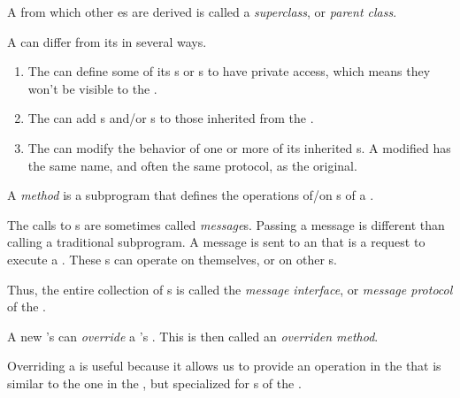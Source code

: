 \begin{definition}[Superclass]\label{def:OOP_Superclass}
  A  from which other es are derived is called a \emph{superclass}, or \emph{parent class}.
\end{definition}

A  can differ from its  in several ways.
\begin{enumerate}[noitemsep]
\item The  can define some of its s or s to have private access, which means they won't be visible to the .
\item The  can add s and/or s to those inherited from the .
\item The  can modify the behavior of one or more of its inherited s. A modified  has the same name, and often the same protocol, as the original.
\end{enumerate}

\begin{definition}[Method]\label{def:OOP_Method}
  A \emph{method} is a subprogram that defines the operations of/on s of a .
\end{definition}

\begin{definition}[Message]\label{def:OOP_Message}
  The calls to s are sometimes called \emph{message}s.
  Passing a message is different than calling a traditional subprogram.
  A message is sent to an  that is a request to execute a .
  These s can operate on themselves, or on other s.
\end{definition}

\begin{definition}\label{def:OOP_Message_Interface}
  Thus, the entire collection of s is called the \emph{message interface}, or \emph{message protocol} of the .
\end{definition}

\begin{definition}[Override]\label{def:OOP_Override}
  A new 's  can \emph{override} a 's .
  This is then called an \emph{overriden method}.

  Overriding a  is useful because it allows us to provide an operation in the  that is similar to the one in the , but specialized for s of the .
\end{definition}

